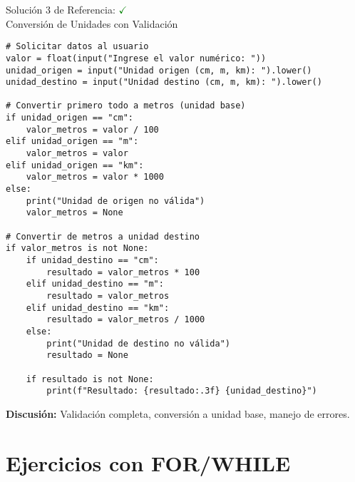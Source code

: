 \documentclass[10pt]{beamer}
\begin{document}
\begin{frame}[fragile]{Solución 3 de Referencia: \hfill \textcolor{green}{$\checkmark$} \\ Conversión de Unidades con Validación}
\begin{verbatim}
# Solicitar datos al usuario
valor = float(input("Ingrese el valor numérico: "))
unidad_origen = input("Unidad origen (cm, m, km): ").lower()
unidad_destino = input("Unidad destino (cm, m, km): ").lower()

# Convertir primero todo a metros (unidad base)
if unidad_origen == "cm":
    valor_metros = valor / 100
elif unidad_origen == "m":
    valor_metros = valor
elif unidad_origen == "km":
    valor_metros = valor * 1000
else:
    print("Unidad de origen no válida")
    valor_metros = None

# Convertir de metros a unidad destino
if valor_metros is not None:
    if unidad_destino == "cm":
        resultado = valor_metros * 100
    elif unidad_destino == "m":
        resultado = valor_metros
    elif unidad_destino == "km":
        resultado = valor_metros / 1000
    else:
        print("Unidad de destino no válida")
        resultado = None
    
    if resultado is not None:
        print(f"Resultado: {resultado:.3f} {unidad_destino}")
\end{verbatim}
\textbf{Discusión:} Validación completa, conversión a unidad base, manejo de errores.
\end{frame}

\section{Ejercicios con FOR/WHILE}
\end{document}
